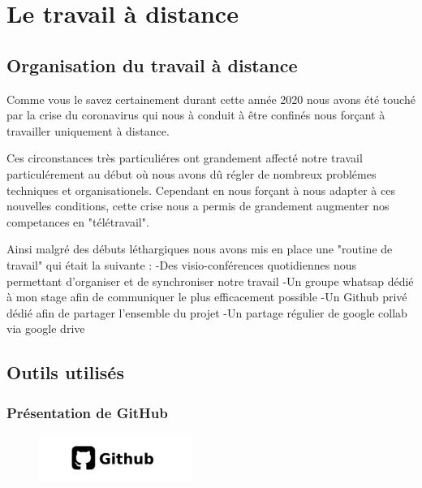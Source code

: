 
\hypertarget{Le-travail-a-distance}{%
\chapter{Le travail à distance}\label{Le-travail-a-distance}}

\hypertarget{Organisation-du-travail-a-distance}{%
\section{Organisation du travail à distance}\label{Organisation-du-travail-a-distance}}


Comme vous le savez certainement durant cette année 2020 nous avons été touché par la crise du coronavirus qui nous à conduit à être confinés nous forçant à travailler uniquement à distance.

Ces circonstances très particuliéres ont grandement affecté notre travail particulérement au début où nous avons dû régler de nombreux problémes techniques et organisationels. Cependant en nous forçant à nous adapter à ces nouvelles conditions, cette crise nous a permis de grandement augmenter nos competances en "télétravail".

Ainsi malgré des débuts léthargiques nous avons mis en place une "routine de travail" qui était la suivante :
-Des visio-conférences quotidiennes nous permettant d'organiser et de synchroniser notre travail
-Un groupe whatsap dédié à mon stage afin de communiquer le plus efficacement possible
-Un Github privé dédié afin de partager l'ensemble du projet
-Un partage régulier de google collab via google drive


\hypertarget{Outils-utilisuxe9s}{%
\section{Outils utilisés}
\label{Outils-utilisuxe9s}}

\hypertarget{Pruxe9sentation-de-GitHub}{%
\subsection{Présentation de GitHub}
\label{Pruxe9sentation-de-GitHub}}

\begin{figure}[h]
  \begin{center}
  \includegraphics[width=5cm]{./images/github.jpg}
  \end{center}
\end{figure}

